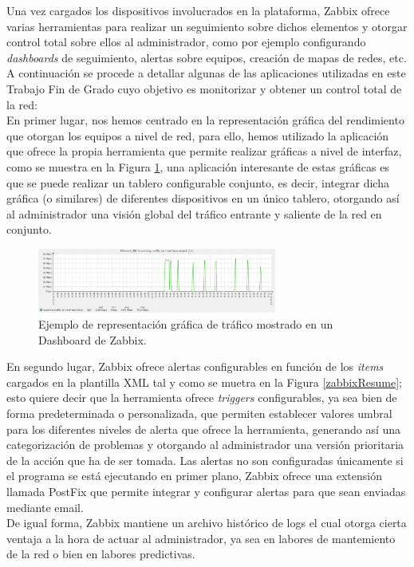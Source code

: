 Una vez cargados los dispositivos involucrados en la plataforma, Zabbix ofrece varias herramientas para realizar un seguimiento sobre dichos elementos y otorgar control total sobre ellos al administrador, como por ejemplo configurando \textit{dashboards} de seguimiento, alertas sobre equipos, creación de mapas de redes, etc. A continuación se procede a detallar algunas de las aplicaciones utilizadas en este Trabajo Fin de Grado cuyo objetivo es monitorizar y obtener un control total de la red:\\

En primer lugar, nos hemos centrado en la representación gráfica del rendimiento que otorgan los equipos a nivel de red, para ello, hemos utilizado la aplicación que ofrece la propia herramienta que permite realizar gráficas a nivel de interfaz, como se muestra en la Figura \ref{zabbixMeasure}, una aplicación interesante de estas gráficas es que se puede realizar un tablero configurable conjunto, es decir, integrar dicha gráfica (o similares) de diferentes dispositivos en un único tablero, otorgando así al administrador una visión global del tráfico entrante y saliente de la red en conjunto.

\begin{figure}[H]
	\centering
	\includegraphics[width=0.7\textwidth]{img/zabbix_measure.png}
	\caption{Ejemplo de representación gráfica de tráfico mostrado en un Dashboard de Zabbix.}
	\label{zabbixMeasure}
\end{figure}

En segundo lugar, Zabbix ofrece alertas configurables en función de los \textit{items} cargados en la plantilla XML tal y como se muetra en la Figura \ref{zabbixResume}; esto quiere decir que la herramienta ofrece \textit{triggers} configurables, ya sea bien de forma predeterminada o personalizada, que permiten establecer valores umbral para los diferentes niveles de alerta que ofrece la herramienta, generando así una categorización de problemas y otorgando al administrador una versión prioritaria de la acción que ha de ser tomada. Las alertas no son configuradas únicamente si el programa se está ejecutando en primer plano, Zabbix ofrece una extensión llamada PostFix \cite{PostFix} que permite integrar y configurar alertas para que sean enviadas mediante email.\\
De igual forma, Zabbix mantiene un archivo histórico de logs el cual otorga cierta ventaja a la hora de actuar al administrador, ya sea en labores de mantemiento de la red o bien en labores predictivas. 

